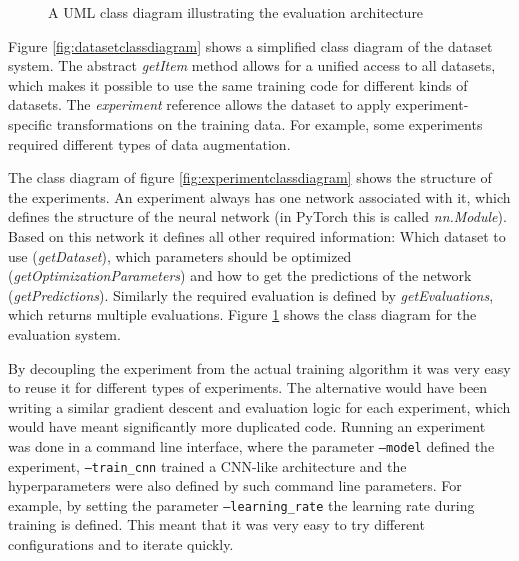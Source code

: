 \documentclass[draft,final,oneside]{vutinfth} %
\begin{document}
\begin{figure}
	\centering
{}
	\caption{A UML class diagram illustrating the evaluation architecture}
	\label{fig:evaluationclassdiagram}
\end{figure}

Figure \ref{fig:datasetclassdiagram} shows a simplified class diagram of the dataset system. The abstract \textit{getItem} method allows for a unified access to all datasets, which makes it possible to use the same training code for different kinds of datasets. The \textit{experiment} reference allows the dataset to apply experiment-specific transformations on the training data. For example, some experiments required different types of data augmentation.

The class diagram of figure \ref{fig:experimentclassdiagram} shows the structure of the experiments. An experiment always has one network associated with it, which defines the structure of the neural network (in PyTorch this is called \textit{nn.Module}). Based on this network it defines all other required information: Which dataset to use (\textit{getDataset}), which parameters should be optimized (\textit{getOptimizationParameters}) and how to get the predictions of the network (\textit{getPredictions}). Similarly the required evaluation is defined by \textit{getEvaluations}, which returns multiple evaluations. Figure \ref{fig:evaluationclassdiagram} shows the class diagram for the evaluation system.

By decoupling the experiment from the actual training algorithm it was very easy to reuse it for different types of experiments. The alternative would have been writing a similar gradient descent and evaluation logic for each experiment, which would have meant significantly more duplicated code. Running an experiment was done in a command line interface, where the parameter \texttt{--model} defined the experiment, \texttt{--train\_cnn} trained a CNN-like architecture and the hyperparameters were also defined by such command line parameters. For example, by setting the parameter \texttt{--learning\_rate} the learning rate during training is defined. This meant that it was very easy to try different configurations and to iterate quickly.
\end{document}
